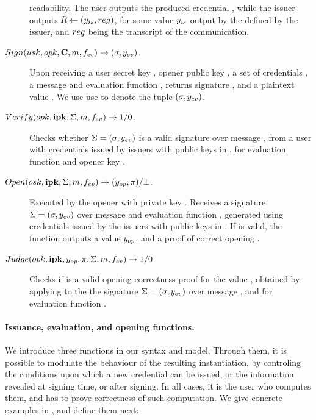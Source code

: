 \begin{description}
  readability. The user outputs the produced credential \Cred, while the issuer
  outputs $R \gets (y_{is},reg)$, for some value $y_{is}$ output by
  the \fissue defined by the issuer, and $reg$ being the transcript of
  the communication.
\item[$Sign(usk,opk,\mathbf{C},m,f_{ev}) \rightarrow (\sigma,y_{ev})$.] %
  Upon receiving a user secret key \usk, opener public key \opk, a set of
  credentials \sCred, a message \msg and evaluation function \feval, returns
  signature \sig, and a plaintext value \yeval. We use use \Sig to denote the
  tuple $(\sigma,y_{ev})$.
\item[$Verify(opk,\mathbf{ipk},\Sigma,m,f_{ev}) \rightarrow 1/0$.]
  Checks whether $\Sigma = (\sigma,y_{ev})$ is a valid signature
  over message \msg, from a user with credentials issued by issuers with public
  keys in \sipk, for evaluation function \feval and opener key \opk.
\item[$Open(osk,\mathbf{ipk},\Sigma,m,f_{ev}) \rightarrow
  (y_{op},\pi)/\bot$.]
  Executed by the opener with private key \osk. Receives a signature $\Sigma=
  (\sigma,y_{ev})$ over message \msg and evaluation function \feval,
  generated using credentials issued by the issuers with public keys in \sipk.
  If \Sig is valid, the function outputs a value $y_{op}$, and a proof of
  correct opening \iproof.
\item[$Judge(opk,\mathbf{ipk},y_{op},\pi,\Sigma,m,f_{ev}) \rightarrow 1/0$.] %
  Checks if \iproof is a valid opening correctness proof for the value \yinsp,
  obtained by applying \Open to the the signature $\Sigma = (\sigma,y_{ev})$
  over message \msg, and for evaluation function \feval. 
\end{description}

\paragraph{Issuance, evaluation, and opening functions.} %
We introduce three functions in our syntax and model. Through them,
it is possible to modulate the behaviour of the resulting instantiation, by
controling the conditions upon which a new credential can be issued, or the
information revealed at signing time, or after signing. In all cases, it is
the user who computes them, and has to prove correctness of such computation.
We give concrete examples in , and define them next:

